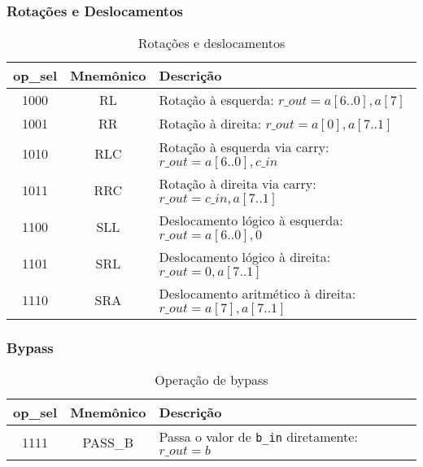 \subsubsection*{Rotações e Deslocamentos}

\begin{table}[H]
\centering
\begin{tabular}{|c|c|l|}
\hline
\textbf{op\_sel} & \textbf{Mnemônico} & \textbf{Descrição} \\ \hline
1000 & RL   & Rotação à esquerda: $r\_out = a[6..0], a[7]$ \\ \hline
1001 & RR   & Rotação à direita: $r\_out = a[0], a[7..1]$ \\ \hline
1010 & RLC  & Rotação à esquerda via carry: $r\_out = a[6..0], c\_in$ \\ \hline
1011 & RRC  & Rotação à direita via carry: $r\_out = c\_in, a[7..1]$ \\ \hline
1100 & SLL  & Deslocamento lógico à esquerda: $r\_out = a[6..0], 0$ \\ \hline
1101 & SRL  & Deslocamento lógico à direita: $r\_out = 0, a[7..1]$ \\ \hline
1110 & SRA  & Deslocamento aritmético à direita: $r\_out = a[7], a[7..1]$ \\ \hline
\end{tabular}
\caption{Rotações e deslocamentos}
\end{table}

\subsubsection*{Bypass}

\begin{table}[H]
\centering
\begin{tabular}{|c|c|l|}
\hline
\textbf{op\_sel} & \textbf{Mnemônico} & \textbf{Descrição} \\ \hline
1111 & PASS\_B & Passa o valor de \texttt{b\_in} diretamente: $r\_out = b$ \\ \hline
\end{tabular}
\caption{Operação de bypass}
\end{table}
